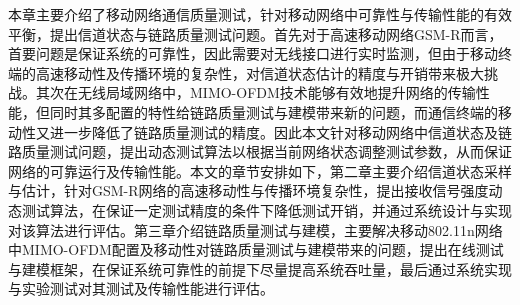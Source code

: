 本章主要介绍了移动网络通信质量测试，针对移动网络中可靠性与传输性能的有效平衡，提出信道状态与链路质量测试问题。首先对于高速移动网络GSM-R而言，首要问题是保证系统的可靠性，因此需要对无线接口进行实时监测，但由于移动终端的高速移动性及传播环境的复杂性，对信道状态估计的精度与开销带来极大挑战。其次在无线局域网络中，MIMO-OFDM技术能够有效地提升网络的传输性能，但同时其多配置的特性给链路质量测试与建模带来新的问题，而通信终端的移动性又进一步降低了链路质量测试的精度。因此本文针对移动网络中信道状态及链路质量测试问题，提出动态测试算法以根据当前网络状态调整测试参数，从而保证网络的可靠运行及传输性能。本文的章节安排如下，第二章主要介绍信道状态采样与估计，针对GSM-R网络的高速移动性与传播环境复杂性，提出接收信号强度动态测试算法，在保证一定测试精度的条件下降低测试开销，并通过系统设计与实现对该算法进行评估。第三章介绍链路质量测试与建模，主要解决移动802.11n网络中MIMO-OFDM配置及移动性对链路质量测试与建模带来的问题，提出在线测试与建模框架，在保证系统可靠性的前提下尽量提高系统吞吐量，最后通过系统实现与实验测试对其测试及传输性能进行评估。
